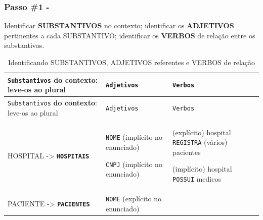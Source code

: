 \documentclass[
]{book}
\begin{document}
\subsubsection{Passo \#1 -}\label{passo-1---2}

Identificar \textbf{SUBSTANTIVOS} no contexto; identificar os \textbf{ADJETIVOS} pertinentes a cada SUBSTANTIVO; identificar os \textbf{VERBOS} de relação entre os substantivos.

\begin{longtable}[]{@{}
  >{\raggedright\arraybackslash}p{}
  >{\raggedright\arraybackslash}p{}
  >{\raggedright\arraybackslash}p{}@{}}
\caption{Identificando SUBSTANTIVOS, ADJETIVOS referentes e VERBOS de relação}\tabularnewline
\toprule\noalign{}
\begin{minipage}[b]{\linewidth}\raggedright
\texttt{Substantivos} \textbf{do contexto}: leve-os ao plural
\end{minipage} & \begin{minipage}[b]{\linewidth}\raggedright
\texttt{Adjetivos}
\end{minipage} & \begin{minipage}[b]{\linewidth}\raggedright
\texttt{Verbos}
\end{minipage} \\
\midrule\noalign{}
\endfirsthead
\toprule\noalign{}
\begin{minipage}[b]{\linewidth}\raggedright
\texttt{Substantivos} \textbf{do contexto}: leve-os ao plural
\end{minipage} & \begin{minipage}[b]{\linewidth}\raggedright
\texttt{Adjetivos}
\end{minipage} & \begin{minipage}[b]{\linewidth}\raggedright
\texttt{Verbos}
\end{minipage} \\
\midrule\noalign{}
\endhead
\bottomrule\noalign{}
\endlastfoot
HOSPITAL -\textgreater{} \textbf{\texttt{HOSPITAIS}} & \texttt{NOME} (implícito no enunciado)

\texttt{CNPJ} (implícito no enunciado) & (explícito) hospital \texttt{REGISTRA} (vários) pacientes

(implícito) hospital \texttt{POSSUI} medicos \\
PACIENTE -\textgreater{} \textbf{\texttt{PACIENTES}} & \texttt{NOME} (explícito no enunciado)


\end{longtable}
\end{document}
